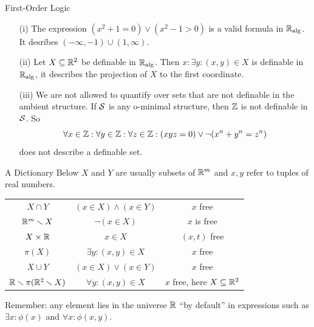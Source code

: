 \documentclass{beamer}
\begin{document}
\begin{frame}{First-Order Logic}
  \begin{example}
    \begin{enumerate}
    \item [(i)] The expression $(x^2+1=0)\vee(x^2-1>0)$ is a valid
      formula in ${\mathbb{R}}_{\mathrm{alg}}$. It desribes $(-\infty,-1)\cup(1,\infty)$.
    \item[(ii)] Let $X\subseteq{\mathbb{R}}^2$ be definable in ${\mathbb{R}}_{\mathrm{alg}}$. Then
      $x : \exists y : (x,y)\in X$ is definable in ${\mathbb{R}}_{\mathrm{alg}}$, it
      describes the projection of $X$ to the first coordinate. 
    \item[(iii)]
      We are not \alert{allowed} to quantify over sets that are not definable in
      the ambient structure. If ${\mathcal S}$ is any o-minimal
      structure, then ${\mathbb{Z}}$ is not definable in ${\mathcal S}$. So 
      $$\forall x \in{\mathbb{Z}}:\forall y\in{\mathbb{Z}} :\forall z\in {\mathbb{Z}} :
      (xyz=0) \vee \neg(x^n+y^n=z^n)$$
      does not describe a definable set.
      
    \end{enumerate}
  \end{example}
\end{frame}

\begin{frame}{A Dictionary}
  Below $X$ and $Y$ are usually subsets of ${\mathbb{R}}^m$ and $x,y$ refer to
  tuples of real numbers. 
  \begin{center}
    \begin{tabular}{c|c|c}
      $X\cap Y$  & $(x\in X)\wedge (x\in Y)$ &
                                                                                                 $x$  free\\
      ${\mathbb{R}}^m\smallsetminus X$  &  $\neg(x\in X)$ & $x$ is free \\
      $X\times{\mathbb{R}}$  & $x\in X$&
                                                                   $(x,t)$
                                                                    free\\
      $\pi(X)$  &$\exists y : (x,y)\in
                                      X$  & $x$  free
      \\  
      $X\cup Y$ & $( x\in X)\vee (x\in Y)$ &
                                                                                               $x$
                                             free\\
      ${\mathbb{R}}\smallsetminus \pi({\mathbb{R}}^2\smallsetminus X)$ & $\forall y : (x,y)\in X$ & $x$
                                                              free,
                                                              here $X\subseteq{\mathbb{R}}^2$
                                             
    \end{tabular}
  \end{center}
  Remember:  any element  lies in the universe ${\mathbb{R}}$  ``by default'' in expressions
  such as $\exists x:\phi(x)$ and $\forall x:\phi(x,y)$.
\end{frame}
\end{document}
